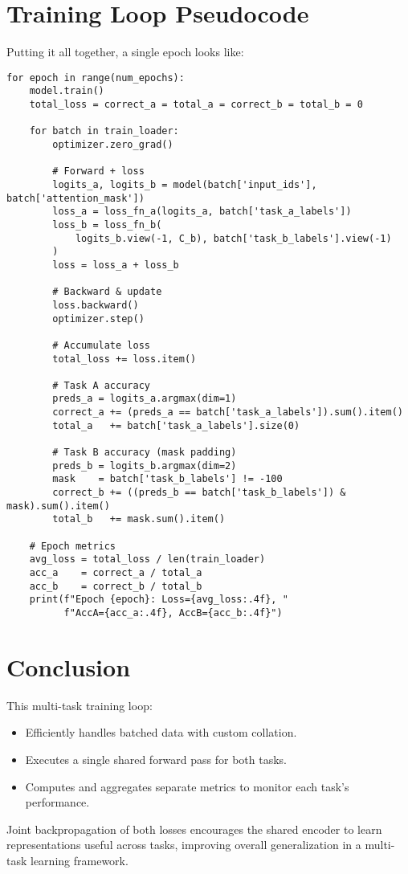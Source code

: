\documentclass{article}
\begin{document}
\section{Training Loop Pseudocode}
Putting it all together, a single epoch looks like:
\begin{lstlisting}
for epoch in range(num_epochs):
    model.train()
    total_loss = correct_a = total_a = correct_b = total_b = 0

    for batch in train_loader:
        optimizer.zero_grad()

        # Forward + loss
        logits_a, logits_b = model(batch['input_ids'], batch['attention_mask'])
        loss_a = loss_fn_a(logits_a, batch['task_a_labels'])
        loss_b = loss_fn_b(
            logits_b.view(-1, C_b), batch['task_b_labels'].view(-1)
        )
        loss = loss_a + loss_b

        # Backward & update
        loss.backward()
        optimizer.step()

        # Accumulate loss
        total_loss += loss.item()

        # Task A accuracy
        preds_a = logits_a.argmax(dim=1)
        correct_a += (preds_a == batch['task_a_labels']).sum().item()
        total_a   += batch['task_a_labels'].size(0)

        # Task B accuracy (mask padding)
        preds_b = logits_b.argmax(dim=2)
        mask    = batch['task_b_labels'] != -100
        correct_b += ((preds_b == batch['task_b_labels']) & mask).sum().item()
        total_b   += mask.sum().item()

    # Epoch metrics
    avg_loss = total_loss / len(train_loader)
    acc_a    = correct_a / total_a
    acc_b    = correct_b / total_b
    print(f"Epoch {epoch}: Loss={avg_loss:.4f}, "
          f"AccA={acc_a:.4f}, AccB={acc_b:.4f}")
\end{lstlisting}

\section*{Conclusion}
This multi-task training loop:
\begin{itemize}
  \item Efficiently handles batched data with custom collation.
  \item Executes a single shared forward pass for both tasks.
  \item Computes and aggregates separate metrics to monitor each task’s performance.
\end{itemize}
Joint backpropagation of both losses encourages the shared encoder to learn representations 
useful across tasks, improving overall generalization in a multi-task learning framework.
\end{document}
